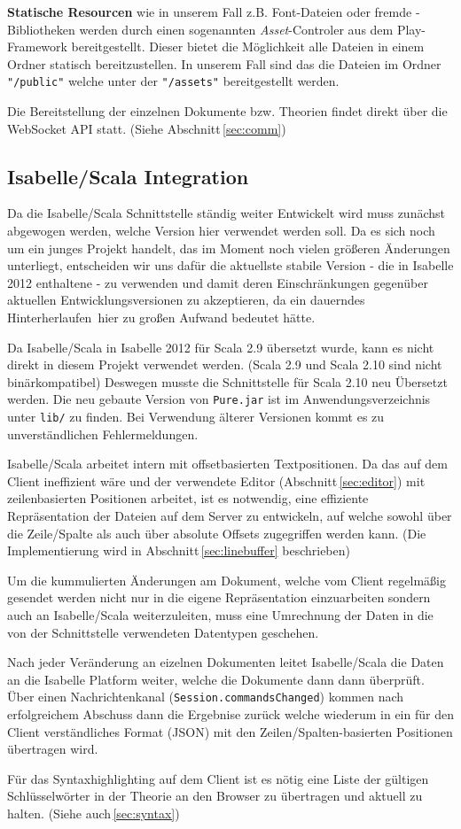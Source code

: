 \textbf{Statische Resourcen} wie in unserem Fall z.B. Font-Dateien oder fremde -Bibliotheken
werden durch einen sogenannten \textit{Asset}-Controler aus dem Play-Framework bereitgestellt.
Dieser bietet die Möglichkeit alle Dateien in einem Ordner statisch bereitzustellen. In unserem Fall
sind das die Dateien im Ordner \texttt{"/public"} welche unter der  \texttt{"/assets"}
bereitgestellt werden.

Die Bereitstellung der einzelnen Dokumente bzw. Theorien findet direkt über die WebSocket API statt.
(Siehe Abschnitt\,\ref{sec:comm})

\subsection{Isabelle/Scala Integration}

Da die Isabelle/Scala Schnittstelle ständig weiter Entwickelt wird muss zunächst abgewogen werden,
welche Version hier verwendet werden soll. Da es sich noch um ein junges Projekt handelt, das im
Moment noch vielen größeren Änderungen unterliegt, entscheiden wir uns dafür die aktuellste stabile
Version - die in Isabelle 2012 enthaltene - zu verwenden und damit deren Einschränkungen gegenüber
aktuellen Entwicklungsversionen zu akzeptieren, da ein dauerndes \glqq Hinterherlaufen\grqq\ hier zu
großen Aufwand bedeutet hätte.

Da Isabelle/Scala in Isabelle 2012 für Scala 2.9 übersetzt wurde, kann es nicht direkt in diesem
Projekt verwendet werden. (Scala 2.9 und Scala 2.10 sind nicht binärkompatibel) Deswegen musste die
Schnittstelle für Scala 2.10 neu Übersetzt werden. Die neu gebaute Version von \texttt{Pure.jar} ist
im Anwendungsverzeichnis unter \texttt{lib/} zu finden. Bei Verwendung älterer Versionen kommt es zu
unverständlichen Fehlermeldungen.

Isabelle/Scala arbeitet intern mit offsetbasierten Textpositionen. Da das auf dem Client ineffizient
wäre und der verwendete Editor (Abschnitt\,\ref{sec:editor}) mit zeilenbasierten Positionen arbeitet,
ist es notwendig, eine effiziente Repräsentation der Dateien auf dem Server zu entwickeln, auf
welche sowohl über die Zeile/Spalte als auch über absolute Offsets zugegriffen werden kann. (Die
Implementierung wird in Abschnitt\,\ref{sec:linebuffer} beschrieben) 

Um die kummulierten Änderungen am Dokument, welche vom Client regelmäßig gesendet werden nicht nur
in die eigene Repräsentation einzuarbeiten sondern auch an Isabelle/Scala weiterzuleiten, muss eine
Umrechnung der Daten in die von der Schnittstelle verwendeten Datentypen geschehen.

Nach jeder Veränderung an eizelnen Dokumenten leitet Isabelle/Scala die Daten an die Isabelle
Platform weiter, welche die Dokumente dann dann überprüft. Über einen Nachrichtenkanal
(\texttt{Session.commandsChanged}) kommen nach erfolgreichem Abschuss dann die Ergebnise zurück
welche wiederum in ein für den Client verständliches Format (JSON) mit den Zeilen/Spalten-basierten
Positionen übertragen wird.

Für das Syntaxhighlighting auf dem Client ist es nötig eine Liste der gültigen Schlüsselwörter in
der Theorie an den Browser zu übertragen und aktuell zu halten. (Siehe auch\,\ref{sec:syntax})